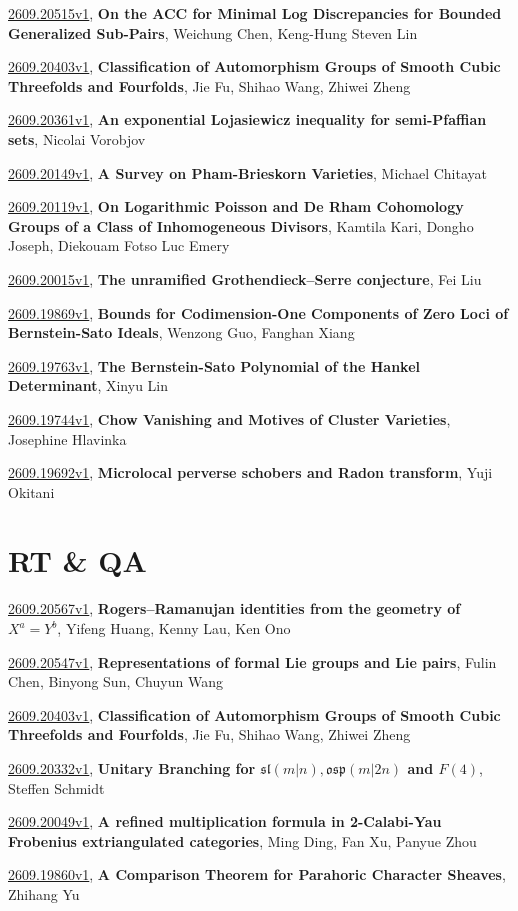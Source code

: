 \documentclass[9pt, a4paper]{article}
\theoremstyle{plain}
\theoremstyle{definition}
\theoremstyle{remark}
\newcommand{\arxiv}[3]{\href{https://arxiv.org/abs/#1}{#1}, \textbf{\textcolor{arxivblue}{#2}}, #3}
\begin{document}
\arxiv{2609.20515v1}{On the ACC for Minimal Log Discrepancies for Bounded Generalized Sub-Pairs}{Weichung Chen, Keng-Hung Steven Lin}

\arxiv{2609.20403v1}{Classification of Automorphism Groups of Smooth Cubic Threefolds and Fourfolds}{Jie Fu, Shihao Wang, Zhiwei Zheng}

\arxiv{2609.20361v1}{An exponential Lojasiewicz inequality for semi-Pfaffian sets}{Nicolai Vorobjov}

\arxiv{2609.20149v1}{A Survey on Pham-Brieskorn Varieties}{Michael Chitayat}

\arxiv{2609.20119v1}{On Logarithmic Poisson and De Rham Cohomology Groups of a Class of Inhomogeneous Divisors}{Kamtila Kari, Dongho Joseph, Diekouam Fotso Luc Emery}

\arxiv{2609.20015v1}{The unramified Grothendieck--Serre conjecture}{Fei Liu}

\arxiv{2609.19869v1}{Bounds for Codimension-One Components of Zero Loci of Bernstein-Sato Ideals}{Wenzong Guo, Fanghan Xiang}

\arxiv{2609.19763v1}{The Bernstein-Sato Polynomial of the Hankel Determinant}{Xinyu Lin}

\arxiv{2609.19744v1}{Chow Vanishing and Motives of Cluster Varieties}{Josephine Hlavinka}

\arxiv{2609.19692v1}{Microlocal perverse schobers and Radon transform}{Yuji Okitani}


\section{RT \& QA}
\arxiv{2609.20567v1}{Rogers--Ramanujan identities from the geometry of $X^a=Y^b$}{Yifeng Huang, Kenny Lau, Ken Ono}

\arxiv{2609.20547v1}{Representations of formal Lie groups and Lie pairs}{Fulin Chen, Binyong Sun, Chuyun Wang}

\arxiv{2609.20403v1}{Classification of Automorphism Groups of Smooth Cubic Threefolds and Fourfolds}{Jie Fu, Shihao Wang, Zhiwei Zheng}

\arxiv{2609.20332v1}{Unitary Branching for $\mathfrak{sl}(m\vert n), \mathfrak{osp}(m\vert 2n)$ and $F(4)$}{Steffen Schmidt}

\arxiv{2609.20049v1}{A refined multiplication formula in 2-Calabi-Yau Frobenius extriangulated categories}{Ming Ding, Fan Xu, Panyue Zhou}

\arxiv{2609.19860v1}{A Comparison Theorem for Parahoric Character Sheaves}{Zhihang Yu}
\end{document}
